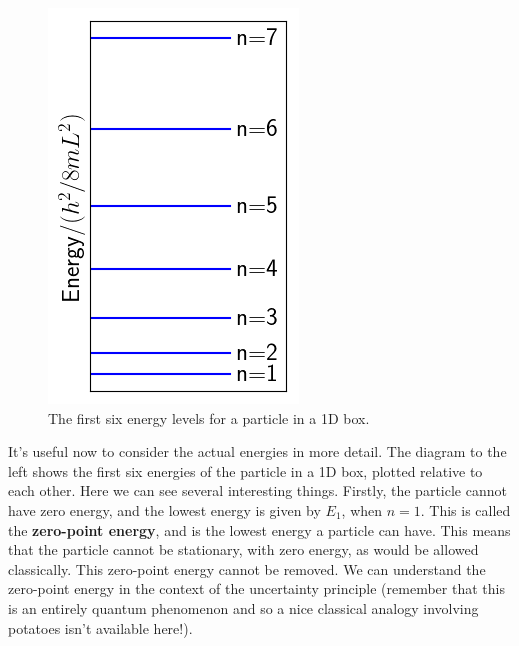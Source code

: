 \documentclass{memoir}[11pt,oneside,a4paper,openany]
\begin{document}
\begin{figure}
	\includegraphics[width=\linewidth]{particle_in_box_energies.png}
	\caption{The first six energy levels for a particle in a 1D box.}
\end{figure}
It's useful now to consider the actual energies in more detail. The diagram to the left shows the first six energies of the particle in a 1D box, plotted relative to each other. Here we can see several interesting things. Firstly, the particle cannot have zero energy, and the lowest energy is given by $E_1$, when $n=1$. This is called the \textbf{zero-point energy}, and is the lowest energy a particle can have. This means that the particle cannot be stationary, with zero energy, as would be allowed classically. This zero-point energy cannot be removed. We can understand the zero-point energy in the context of the uncertainty principle (remember that this is an entirely quantum phenomenon and so a nice classical analogy involving potatoes isn't available here!). 
\end{document}
